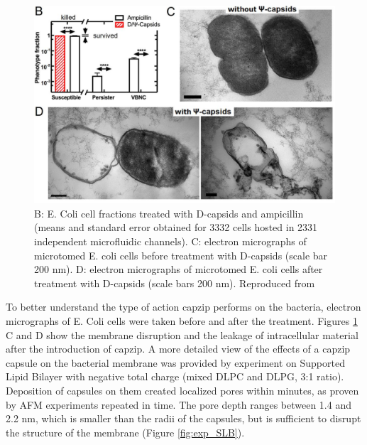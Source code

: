 \begin{figure}
\begin{center}
\includegraphics[width=0.8\linewidth, align = c]{1introduction/pics/ecoli_disruption}
\caption[Effect of capzip on bacterial cells]{B: E. Coli cell fractions treated with D-capsids and ampicillin (means and standard error obtained for 3332 cells hosted in 2331 independent microfluidic channels). C: electron micrographs of microtomed E. coli cells before treatment with D-capsids (scale bar 200 nm). D: electron micrographs of microtomed E. coli cells after treatment with D-capsids (scale bars 200 nm). Reproduced from \citet{Kepiro2019}} \label{fig:exp_ecoli}
\end{center}
\end{figure}

To better understand the type of action capzip performs on the bacteria, electron micrographs of E. Coli cells were taken before and after the treatment. Figures \ref{fig:exp_ecoli} C and D show the membrane disruption and the leakage of intracellular material after the introduction of capzip.
%
A more detailed view of the effects of a capzip capsule on the bacterial membrane was provided by experiment on Supported Lipid Bilayer with negative total charge (mixed DLPC and DLPG, 3:1 ratio). Deposition of capsules on them created localized pores within minutes, as proven by AFM experiments repeated in time. The pore depth ranges between 1.4 and 2.2 nm, which is smaller than the radii of the capsules, but is sufficient to disrupt the structure of the membrane (Figure \ref{fig:exp_SLB}).

